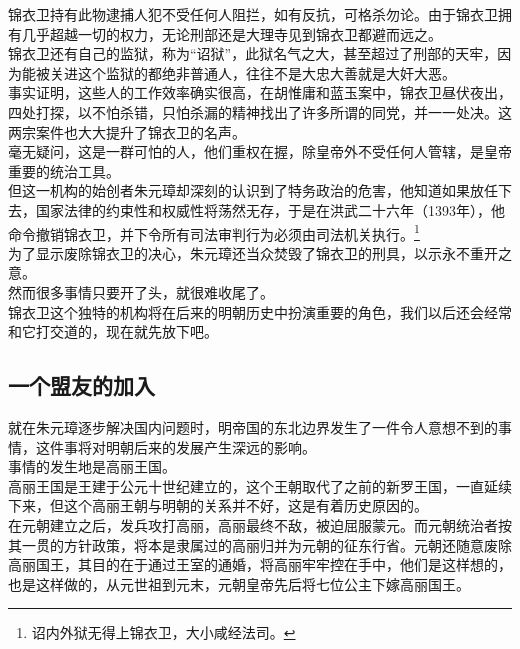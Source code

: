\begin{multicols}{\theparacolNo}
锦衣卫持有此物逮捕人犯不受任何人阻拦，如有反抗，可格杀勿论。由于锦衣卫拥有几乎超越一切的权力，无论刑部还是大理寺见到锦衣卫都避而远之。\\

锦衣卫还有自己的监狱，称为“诏狱”，此狱名气之大，甚至超过了刑部的天牢，因为能被关进这个监狱的都绝非普通人，往往不是大忠大善就是大奸大恶。\\

事实证明，这些人的工作效率确实很高，在胡惟庸和蓝玉案中，锦衣卫昼伏夜出，四处打探，以不怕杀错，只怕杀漏的精神找出了许多所谓的同党，并一一处决。这两宗案件也大大提升了锦衣卫的名声。\\

毫无疑问，这是一群可怕的人，他们重权在握，除皇帝外不受任何人管辖，是皇帝重要的统治工具。\\

但这一机构的始创者朱元璋却深刻的认识到了特务政治的危害，他知道如果放任下去，国家法律的约束性和权威性将荡然无存，于是在洪武二十六年（1393年），他命令撤销锦衣卫，并下令所有司法审判行为必须由司法机关执行。\footnote{诏内外狱无得上锦衣卫，大小咸经法司。}\\

为了显示废除锦衣卫的决心，朱元璋还当众焚毁了锦衣卫的刑具，以示永不重开之意。\\

然而很多事情只要开了头，就很难收尾了。\\

锦衣卫这个独特的机构将在后来的明朝历史中扮演重要的角色，我们以后还会经常和它打交道的，现在就先放下吧。\\

\subsection{一个盟友的加入}
就在朱元璋逐步解决国内问题时，明帝国的东北边界发生了一件令人意想不到的事情，这件事将对明朝后来的发展产生深远的影响。\\

事情的发生地是高丽王国。\\

高丽王国是王建于公元十世纪建立的，这个王朝取代了之前的新罗王国，一直延续下来，但这个高丽王朝与明朝的关系并不好，这是有着历史原因的。\\

在元朝建立之后，发兵攻打高丽，高丽最终不敌，被迫屈服蒙元。而元朝统治者按其一贯的方针政策，将本是隶属过的高丽归并为元朝的征东行省。元朝还随意废除高丽国王，其目的在于通过王室的通婚，将高丽牢牢控在手中，他们是这样想的，也是这样做的，从元世祖到元末，元朝皇帝先后将七位公主下嫁高丽国王。\\


\end{multicols}
